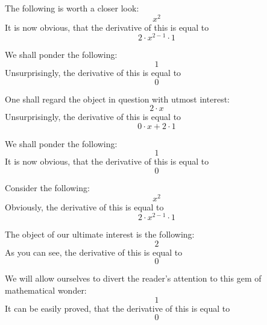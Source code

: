 \documentclass{article}
\begin{document}
The following is worth a closer look:
\begin{equation}
x ^{2 } 
\end{equation}
It is now obvious, that the derivative of this is equal to
\begin{equation}
2 \cdot x ^{2 - 1 } \cdot 1 
\end{equation}

We shall ponder the following:
\begin{equation}
1 
\end{equation}
Unsurprisingly, the derivative of this is equal to
\begin{equation}
0 
\end{equation}

One shall regard the object in question with utmost interest:
\begin{equation}
2 \cdot x 
\end{equation}
Unsurprisingly, the derivative of this is equal to
\begin{equation}
0 \cdot x + 2 \cdot 1 
\end{equation}

We shall ponder the following:
\begin{equation}
1 
\end{equation}
It is now obvious, that the derivative of this is equal to
\begin{equation}
0 
\end{equation}

Consider the following:
\begin{equation}
x ^{2 } 
\end{equation}
Obviously, the derivative of this is equal to
\begin{equation}
2 \cdot x ^{2 - 1 } \cdot 1 
\end{equation}

The object of our ultimate interest is the following:
\begin{equation}
2 
\end{equation}
As you can see, the derivative of this is equal to
\begin{equation}
0 
\end{equation}

We will allow ourselves to divert the reader's attention to this gem of mathematical wonder:
\begin{equation}
1 
\end{equation}
It can be easily proved, that the derivative of this is equal to
\begin{equation}
0 
\end{equation}
\end{document}
